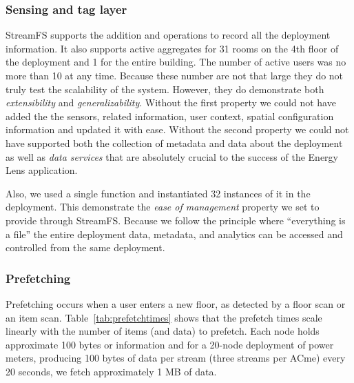 \subsubsection{Sensing and tag layer}

StreamFS supports the addition and operations to record all the deployment information.  It also supports active aggregates for 
31 rooms on the 4th floor of the deployment and 1 for the entire building.  The number of active users was no more than 10 at any time.
Because these number are not that large they do not truly test the scalability of the system.  However, they do demonstrate
both \emph{extensibility} and \emph{generalizability}.  Without the first property we could not have added the the sensors,
related information, user context, spatial configuration information and updated it with ease.  Without the second property
we could not have supported both the collection of metadata and data about the deployment as well as \emph{data services} that
are absolutely crucial to the success of the Energy Lens application.

Also, we used a single function and instantiated 32 instances of it in the deployment.  This demonstrate the \emph{ease of management}
property we set to provide through StreamFS.  Because we follow the principle where ``everything is a file'' the entire deployment
data, metadata, and analytics can be accessed and controlled from the same deployment.

\subsubsection{Prefetching}
Prefetching occurs when a user enters a new floor, as detected by a floor scan or an item
scan.  Table~\ref{tab:prefetchtimes} shows that the prefetch times scale linearly with the number of
items (and data) to prefetch.  Each node holds approximate 100 bytes or information and for
a 20-node deployment of power meters, producing 100 bytes of data per stream (three streams per ACme) every 20 seconds, we fetch 
approximately 1 MB of data.

